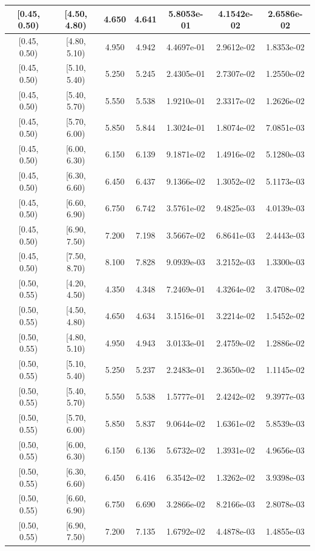 \begin{longtable}{|c|c|c|c|c|c|c|}
\hline
[0.45, 0.50) & [4.50, 4.80) & 4.650 & 4.641 & 5.8053e-01 & 4.1542e-02 & 2.6586e-02 \\ 
\hline
[0.45, 0.50) & [4.80, 5.10) & 4.950 & 4.942 & 4.4697e-01 & 2.9612e-02 & 1.8353e-02 \\ 
\hline
[0.45, 0.50) & [5.10, 5.40) & 5.250 & 5.245 & 2.4305e-01 & 2.7307e-02 & 1.2550e-02 \\ 
\hline
[0.45, 0.50) & [5.40, 5.70) & 5.550 & 5.538 & 1.9210e-01 & 2.3317e-02 & 1.2626e-02 \\ 
\hline
[0.45, 0.50) & [5.70, 6.00) & 5.850 & 5.844 & 1.3024e-01 & 1.8074e-02 & 7.0851e-03 \\ 
\hline
[0.45, 0.50) & [6.00, 6.30) & 6.150 & 6.139 & 9.1871e-02 & 1.4916e-02 & 5.1280e-03 \\ 
\hline
[0.45, 0.50) & [6.30, 6.60) & 6.450 & 6.437 & 9.1366e-02 & 1.3052e-02 & 5.1173e-03 \\ 
\hline
[0.45, 0.50) & [6.60, 6.90) & 6.750 & 6.742 & 3.5761e-02 & 9.4825e-03 & 4.0139e-03 \\ 
\hline
[0.45, 0.50) & [6.90, 7.50) & 7.200 & 7.198 & 3.5667e-02 & 6.8641e-03 & 2.4443e-03 \\ 
\hline
[0.45, 0.50) & [7.50, 8.70) & 8.100 & 7.828 & 9.0939e-03 & 3.2152e-03 & 1.3300e-03 \\ 
\hline
[0.50, 0.55) & [4.20, 4.50) & 4.350 & 4.348 & 7.2469e-01 & 4.3264e-02 & 3.4708e-02 \\ 
\hline
[0.50, 0.55) & [4.50, 4.80) & 4.650 & 4.634 & 3.1516e-01 & 3.2214e-02 & 1.5452e-02 \\ 
\hline
[0.50, 0.55) & [4.80, 5.10) & 4.950 & 4.943 & 3.0133e-01 & 2.4759e-02 & 1.2886e-02 \\ 
\hline
[0.50, 0.55) & [5.10, 5.40) & 5.250 & 5.237 & 2.2483e-01 & 2.3650e-02 & 1.1145e-02 \\ 
\hline
[0.50, 0.55) & [5.40, 5.70) & 5.550 & 5.538 & 1.5777e-01 & 2.4242e-02 & 9.3977e-03 \\ 
\hline
[0.50, 0.55) & [5.70, 6.00) & 5.850 & 5.837 & 9.0644e-02 & 1.6361e-02 & 5.8539e-03 \\ 
\hline
[0.50, 0.55) & [6.00, 6.30) & 6.150 & 6.136 & 5.6732e-02 & 1.3931e-02 & 4.9656e-03 \\ 
\hline
[0.50, 0.55) & [6.30, 6.60) & 6.450 & 6.416 & 6.3542e-02 & 1.3262e-02 & 3.9398e-03 \\ 
\hline
[0.50, 0.55) & [6.60, 6.90) & 6.750 & 6.690 & 3.2866e-02 & 8.2166e-03 & 2.8078e-03 \\ 
\hline
[0.50, 0.55) & [6.90, 7.50) & 7.200 & 7.135 & 1.6792e-02 & 4.4878e-03 & 1.4855e-03 \\ 

\end{longtable}
